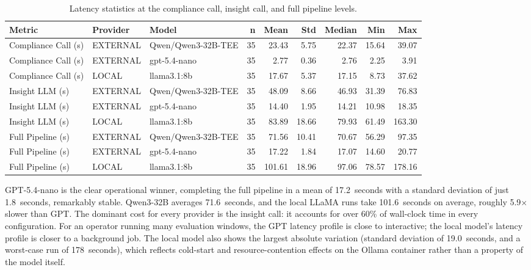 \documentclass[]{UCD_CS_FYP_Report}
\begin{document}
\begin{table}[!ht]
    \centering
    {\footnotesize
        \begin{tabular}{|l|l|l|r|r|r|r|r|r|}
        \hline
            \textbf{Metric} & \textbf{Provider} & \textbf{Model} & \textbf{n} & \textbf{Mean} & \textbf{Std} & \textbf{Median} & \textbf{Min} & \textbf{Max} \\ \hline
            Compliance Call (s) & EXTERNAL & Qwen/Qwen3-32B-TEE & 35 &  23.43 &  5.75 &  22.37 & 15.64 &  39.07 \\ \hline
            Compliance Call (s) & EXTERNAL & gpt-5.4-nano       & 35 &   2.77 &  0.36 &   2.76 &  2.25 &   3.91 \\ \hline
            Compliance Call (s) & LOCAL    & llama3.1:8b        & 35 &  17.67 &  5.37 &  17.15 &  8.73 &  37.62 \\ \hline
            Insight LLM (s)     & EXTERNAL & Qwen/Qwen3-32B-TEE & 35 &  48.09 &  8.66 &  46.93 & 31.39 &  76.83 \\ \hline
            Insight LLM (s)     & EXTERNAL & gpt-5.4-nano       & 35 &  14.40 &  1.95 &  14.21 & 10.98 &  18.35 \\ \hline
            Insight LLM (s)     & LOCAL    & llama3.1:8b        & 35 &  83.89 & 18.66 &  79.93 & 61.49 & 163.30 \\ \hline
            Full Pipeline (s)   & EXTERNAL & Qwen/Qwen3-32B-TEE & 35 &  71.56 & 10.41 &  70.67 & 56.29 &  97.35 \\ \hline
            Full Pipeline (s)   & EXTERNAL & gpt-5.4-nano       & 35 &  17.22 &  1.84 &  17.07 & 14.60 &  20.77 \\ \hline
            Full Pipeline (s)   & LOCAL    & llama3.1:8b        & 35 & 101.61 & 18.96 &  97.06 & 78.57 & 178.16 \\ \hline
        \end{tabular}
    }
    \caption{Latency statistics at the compliance call, insight call, and full pipeline levels.}
    \label{tab:latency_stats}
\end{table}
 
GPT-5.4-nano is the clear operational winner, completing the full pipeline in a mean of 17.2~seconds with a standard deviation of just 1.8~seconds, remarkably stable. Qwen3-32B averages 71.6~seconds, and the local LLaMA runs take 101.6~seconds on average, roughly 5.9$\times$ slower than GPT. The dominant cost for every provider is the insight call: it accounts for over 60\% of wall-clock time in every configuration. For an operator running many evaluation windows, the GPT latency profile is close to interactive; the local model's latency profile is closer to a background job. The local model also shows the largest absolute variation (standard deviation of 19.0~seconds, and a worst-case run of 178~seconds), which reflects cold-start and resource-contention effects on the Ollama container rather than a property of the model itself.
 
\end{document}
